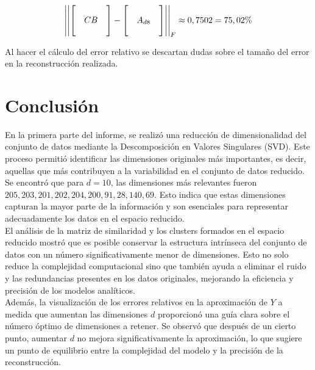 \documentclass[12pt,a4]{article} %
\begin{document}
\begin{equation}
    \centering
    \left|\left|\begin{bmatrix}
            &   &   \\
            &CB &   \\
            &   &   
    \end{bmatrix} - \begin{bmatrix}
            &   &   \\
            &A_{d8}&    \\
            &   &   
    \end{bmatrix}\right|\right|_F \approx 0,7502 = 75,02\%
\end{equation}

Al hacer el cálculo del error relativo se descartan dudas sobre el tamaño del error en la reconstrucción realizada.

\section{Conclusión}
En la primera parte del informe, se realizó una reducción de dimensionalidad del conjunto de datos mediante la Descomposición en Valores Singulares (SVD). Este proceso permitió identificar las dimensiones originales más importantes, es decir, aquellas que más contribuyen a la variabilidad en el conjunto de datos reducido. Se encontró que para \(d=10\), las dimensiones más relevantes fueron \(205, 203, 201, 202, 204, 200, 91, 28, 140, 69\). Esto indica que estas dimensiones capturan la mayor parte de la información y son esenciales para representar adecuadamente los datos en el espacio reducido. 
\\

El análisis de la matriz de similaridad y los clusters formados en el espacio reducido mostró que es posible conservar la estructura intrínseca del conjunto de datos con un número significativamente menor de dimensiones. Esto no solo reduce la complejidad computacional sino que también ayuda a eliminar el ruido y las redundancias presentes en los datos originales, mejorando la eficiencia y precisión de los modelos analíticos.
\\

Además, la visualización de los errores relativos en la aproximación de \(Y\) a medida que aumentan las dimensiones \(d\) proporcionó una guía clara sobre el número óptimo de dimensiones a retener. Se observó que después de un cierto punto, aumentar \(d\) no mejora significativamente la aproximación, lo que sugiere un punto de equilibrio entre la complejidad del modelo y la precisión de la reconstrucción.
\\
\end{document}
